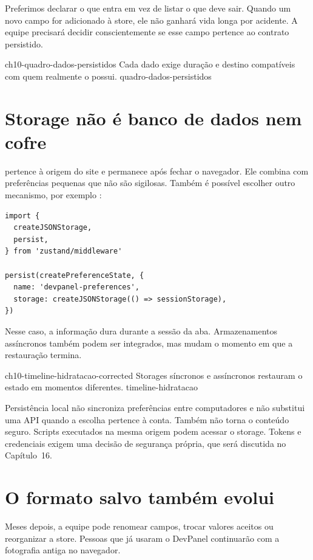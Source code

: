 Preferimos declarar o que entra em vez de listar o que deve sair. Quando um novo
campo for adicionado à store, ele não ganhará vida longa por acidente. A equipe
precisará decidir conscientemente se esse campo pertence ao contrato persistido.

\imagemcapitulo
  {ch10-quadro-dados-persistidos}
  {Cada dado exige duração e destino compatíveis com quem realmente o possui.}
  {quadro-dados-persistidos}

\section{Storage não é banco de dados nem cofre}

 pertence à origem do site e permanece após fechar o
navegador. Ele combina com preferências pequenas que não são sigilosas. Também
é possível escolher outro mecanismo, por exemplo :

\begin{lstlisting}
import {
  createJSONStorage,
  persist,
} from 'zustand/middleware'

persist(createPreferenceState, {
  name: 'devpanel-preferences',
  storage: createJSONStorage(() => sessionStorage),
})
\end{lstlisting}

Nesse caso, a informação dura durante a sessão da aba. Armazenamentos assíncronos
também podem ser integrados, mas mudam o momento em que a restauração termina.

\imagemcapitulo
  {ch10-timeline-hidratacao-corrected}
  {Storages síncronos e assíncronos restauram o estado em momentos diferentes.}
  {timeline-hidratacao}

Persistência local não sincroniza preferências entre computadores e não substitui
uma API quando a escolha pertence à conta. Também não torna o conteúdo seguro.
Scripts executados na mesma origem podem acessar o storage. Tokens e credenciais
exigem uma decisão de segurança própria, que será discutida no Capítulo~16.

\section{O formato salvo também evolui}

Meses depois, a equipe pode renomear campos, trocar valores aceitos ou reorganizar
a store. Pessoas que já usaram o DevPanel continuarão com a fotografia antiga no
navegador.

